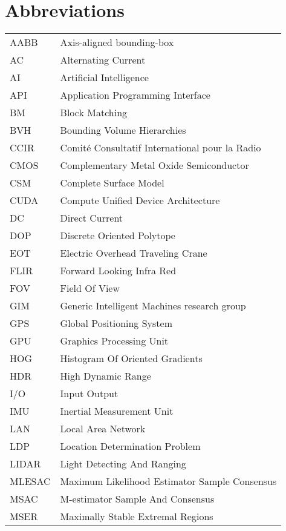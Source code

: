 \documentclass[12pt,a4paper,oneside,pdftex]{report}
\begin{document}
\chapter*{Abbreviations}


\noindent
\begin{longtable}{@{}p{}p{}@{}}
AABB & Axis-aligned bounding-box \\
AC & Alternating Current \\
AI & Artificial Intelligence \\
API & Application Programming Interface \\
BM & Block Matching \\
BVH & Bounding Volume Hierarchies \\
CCIR & Comité Consultatif International pour la Radio \\
CMOS & Complementary Metal Oxide Semiconductor \\
CSM & Complete Surface Model \\
CUDA & Compute Unified Device Architecture \\
DC & Direct Current \\
DOP & Discrete Oriented Polytope \\
EOT & Electric Overhead Traveling Crane \\
FLIR & Forward Looking Infra Red \\
FOV & Field Of View \\
GIM & Generic Intelligent Machines research group \\
GPS & Global Positioning System \\
GPU & Graphics Processing Unit \\
HOG & Histogram Of Oriented Gradients \\
HDR & High Dynamic Range \\
I/O & Input Output\\
IMU & Inertial Measurement Unit \\
LAN & Local Area Network \\
LDP & Location Determination Problem \\
LIDAR & Light Detecting And Ranging \\
MLESAC & Maximum Likelihood Estimator Sample Consensus \\
MSAC & M-estimator Sample And Consensus \\
MSER & Maximally Stable Extremal Regions \\ 

\end{longtable}
\end{document}
